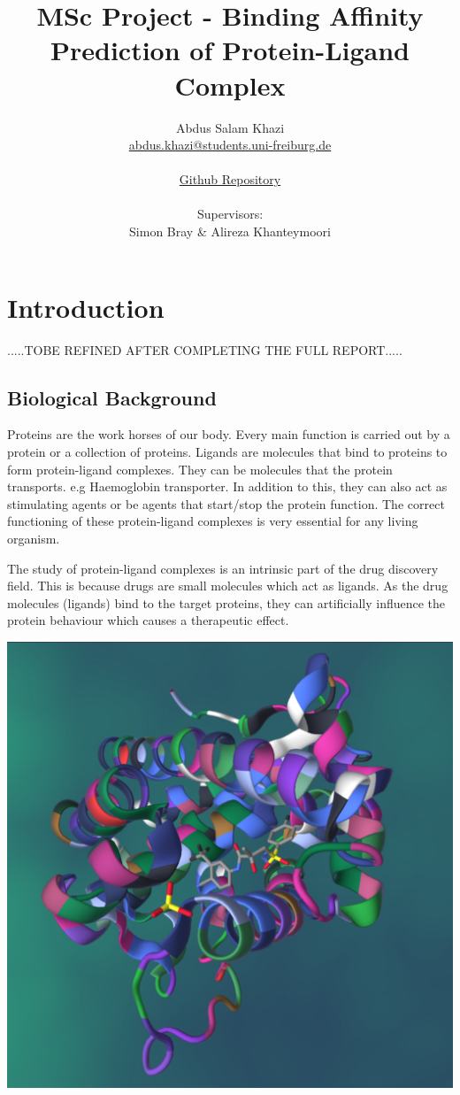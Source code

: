 \documentclass[11pt]{article}
\title{MSc Project - Binding Affinity Prediction of Protein-Ligand Complex}
\author{
        Abdus Salam Khazi\\
        \href{mailto:abdus.khazi@students.uni-freiburg.de}
                {abdus.khazi@students.uni-freiburg.de}\\ \\
        \href{https://github.com/abduskhazi/MSc-Project}
                {Github Repository} \cite{github_repository} \\ \\
        Supervisors:
        \begin{tabular}{ll}
			Simon Bray \&
			Alireza Khanteymoori
		\end{tabular}
       }
\begin{document}
\maketitle
\date{}
\tableofcontents
\newpage

\section{Introduction}
.....TOBE REFINED AFTER COMPLETING THE FULL REPORT.....

\subsection{Biological Background}
Proteins are the work horses of our body.
Every main function is carried out by a protein or a collection of proteins.
Ligands are molecules that bind to proteins to form protein-ligand complexes.
They can be molecules that the protein transports. e.g Haemoglobin transporter.
In addition to this, they can also act as stimulating agents or 
be agents that start/stop the protein function.
The correct functioning of these protein-ligand complexes is very essential for any living organism.

The study of protein-ligand complexes is an intrinsic part of the drug discovery field.
This is because drugs are small molecules which act as ligands.
As the drug molecules (ligands) bind to the target proteins, they can artificially influence
the protein behaviour which causes a therapeutic effect.

\includegraphics[scale=0.15]{pl_complex}
\cite{PL_complex_introduction}
\end{document}

